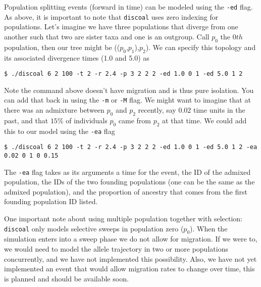 \documentclass[12pt]{article}
\begin{document}
Population splitting events (forward in time) can be modeled using the \texttt{-ed} flag. As above, it is important to note that \texttt{discoal} uses zero indexing for populations. Let's imagine we have three populations that diverge from one another such that two are sister taxa and one is an outgroup. Call $p_0$ the $0th$ population, then our tree might be (($p_0$,$p_1$),$p_2$). We can specify this topology and its associated divergence times (1.0 and 5.0) as
\begin{verbatim}
$ ./discoal 6 2 100 -t 2 -r 2.4 -p 3 2 2 2 -ed 1.0 0 1 -ed 5.0 1 2
\end{verbatim}
Note the command above doesn't have migration and is thus pure isolation. You can add that back in using the \texttt{-m} or \texttt{-M} flag.
We might want to imagine that at there was an admixture between $p_0$ and $p_2$ recently, say $0.02$ time units in the past, and that $15\%$ of individuals $p_0$ came from $p_2$ at that time. We could add this to our model using the \texttt{-ea} flag

\begin{verbatim}
$ ./discoal 6 2 100 -t 2 -r 2.4 -p 3 2 2 2 -ed 1.0 0 1 -ed 5.0 1 2 -ea 0.02 0 1 0 0.15
\end{verbatim}
The \texttt{-ea} flag takes as its arguments a time for the event, the ID of the admixed population, the IDs of the two founding populations (one can be the same as the admixed population), and the proportion of ancestry that comes from the first founding population ID listed. 

One important note about using multiple population together with selection: \texttt{discoal} only models selective sweeps in population zero ($p_0$). When the simulation enters into a sweep phase we do not allow for migration. If we were to, we would need to model the allele trajectory in two or more populations concurrently, and we have not implemented this possibility. Also, we have not yet implemented an event that would allow migration rates to change over time, this is planned and should be available soon. 
\end{document}
